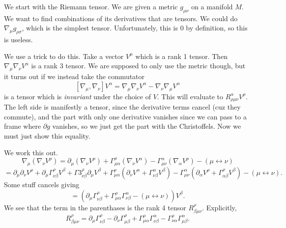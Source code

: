 
We start with the Riemann tensor. We are given a metric $g_{\mu \nu } $ on a manifold $M$. We want to find combinations of its derivatives that are tensors. We could do $\nabla _\mu g_{\rho \sigma } $, which is the simplest tensor. Unfortunately, this is 0 by definition, so this is useless.

We use a trick to do this. Take a vector $V^\mu $ which is a rank 1 tensor. Then $\nabla _\mu \nabla _\nu V^\alpha $ is a rank 3 tensor. We are supposed to only use the metric though, but it turns out if we instead take the commutator
\[
	\left[ \nabla _\mu ,\nabla _\nu  \right] V^\alpha =\nabla _\mu \nabla _\nu V^\alpha -\nabla _\nu \nabla _\mu V^\alpha 
\]
is a tensor which is \emph{invariant} under the choice of $V$. This will evaluate to $R^\alpha _{\rho \mu \nu } V^\rho $. The left side is manifestly a tensor, since the derivative terms cancel (cuz they commute), and the part with only one derivative vanishes since we can pass to a frame where $\partial g$ vanishes, so we just get the part with the Christoffels. Now we must just show this equality.

We work this out.
\[
	\nabla _\mu \left( \nabla _\nu V^\rho  \right) =\partial _\mu \left( \nabla_\nu V^\rho \right) +\Gamma _{\mu \alpha } ^\rho (\nabla _\nu V^\alpha )-\Gamma _{\mu \nu } ^\alpha (\nabla _\alpha V^\rho )-\left( \mu \leftrightarrow \nu  \right) 
\]
\[
	=\partial _\mu \partial _\nu V^\rho +\partial _\mu \Gamma _{\nu \beta } ^\rho V^\beta +\Gamma 3_{\nu \beta } ^\rho \partial _\mu V^\beta +\Gamma _{\mu \alpha } ^\rho \left( \partial _\nu V^\alpha +\Gamma _{\nu \beta } ^\alpha V^\beta  \right) -\Gamma _{\mu \nu } ^\alpha \left( \partial _\alpha V^\rho +\Gamma _{\alpha \beta } ^\rho V^\beta  \right) -(\mu \leftrightarrow \nu )
.\]
Some stuff cancels giving
\[
	=\left( \partial _\mu \Gamma _{\nu \beta } ^\rho +\Gamma _{\mu \alpha } ^\rho \Gamma _{\nu \beta } ^\alpha -\left( \mu \leftrightarrow \nu  \right)  \right) V^\beta 
.\]
We see that the term in the parenthases is the rank 4 tensor $R^\rho _{\beta \mu \nu } $. Explicitly,
\[
	R^\rho _{\beta \mu \nu } =\partial _\mu \Gamma _{\nu \beta } ^\rho -\partial _\nu \Gamma _{\mu \beta } ^\rho +\Gamma _{\mu \alpha } ^\rho \Gamma ^\alpha _{\nu \beta } -\Gamma ^\rho _{\nu \alpha } \Gamma ^\alpha _{\mu \beta } 
.\]


